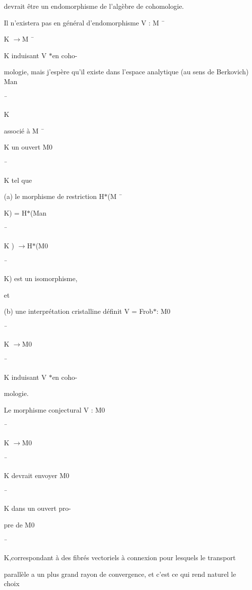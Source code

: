 \documentclass[11pt]{article}
\begin{document}
\noindent devrait être un endomorphisme de l’algèbre de cohomologie.\par
\noindent Il n’existera pas en général d’endomorphisme V : M ¯\par
\noindent K \(\to\)M ¯\par
\noindent K induisant V \(*\)en coho-\par
\noindent mologie, mais j’espère qu’il existe dans l’espace analytique (au sens de Berkovich) Man\par
\noindent ¯\par
\noindent K\par
\noindent associé à M ¯\par
\noindent K un ouvert M0\par
\noindent ¯\par
\noindent K tel que\par
\noindent (a) le morphisme de restriction H\(*\)(M ¯\par
\noindent K) = H\(*\)(Man\par
\noindent ¯\par
\noindent K ) \(\to\)H\(*\)(M0\par
\noindent ¯\par
\noindent K) est un isomorphisme,\par
\noindent et\par
\noindent (b) une interprétation cristalline définit V = Frob\(*\): M0\par
\noindent ¯\par
\noindent K \(\to\)M0\par
\noindent ¯\par
\noindent K induisant V \(*\)en coho-\par
\noindent mologie.\par
\medskip
\noindent Le morphisme conjectural V : M0\par
\noindent ¯\par
\noindent K \(\to\)M0\par
\noindent ¯\par
\noindent K devrait envoyer M0\par
\noindent ¯\par
\noindent K dans un ouvert pro-\par
\noindent pre de M0\par
\noindent ¯\par
\noindent K,correspondant à des fibrés vectoriels à connexion pour lesquels le transport\par
\noindent parallèle a un plus grand rayon de convergence, et c’est ce qui rend naturel le choix\par
\end{document}
